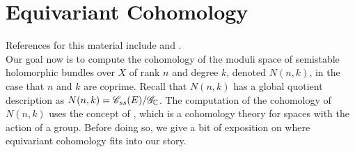 %
\section{Equivariant Cohomology}
%
References for this material include \cite{TuEC} and \cite{Kirwan}. \\

Our goal now is to compute the cohomology of the moduli space
of semistable holomorphic bundles over $X$ of rank $n$ and degree $k$,
denoted $N(n,k)$, in the case that $n$ and $k$ are coprime. Recall that
$N(n,k)$ has a global quotient description as
$N(n,k) = \mathscr{C}_{ss}(E)/\mathscr{G}_{\mathbb{C}}$. The computation of
the cohomology of $N(n,k)$ uses the concept of ,
which is a cohomology theory for spaces with the action of a group. Before
doing so, we give a bit of exposition on where equivariant cohomology fits
into our story. \\

